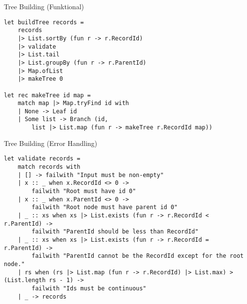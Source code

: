\documentclass[t]{beamer}
\begin{document}
\begin{frame}[label={sec:org32177ed},fragile]{Tree Building (Funktional)}
 \begin{verbatim}
let buildTree records = 
    records
    |> List.sortBy (fun r -> r.RecordId)
    |> validate
    |> List.tail
    |> List.groupBy (fun r -> r.ParentId)
    |> Map.ofList
    |> makeTree 0

let rec makeTree id map =
    match map |> Map.tryFind id with
    | None -> Leaf id
    | Some list -> Branch (id, 
        list |> List.map (fun r -> makeTree r.RecordId map))
\end{verbatim}
\end{frame}

\begin{frame}[label={sec:org222dd47},fragile]{Tree Building (Error Handling)}
 \begin{verbatim}
let validate records =
    match records with
    | [] -> failwith "Input must be non-empty"
    | x :: _ when x.RecordId <> 0 -> 
        failwith "Root must have id 0"
    | x :: _ when x.ParentId <> 0 -> 
        failwith "Root node must have parent id 0"
    | _ :: xs when xs |> List.exists (fun r -> r.RecordId < r.ParentId) -> 
        failwith "ParentId should be less than RecordId"
    | _ :: xs when xs |> List.exists (fun r -> r.RecordId = r.ParentId) -> 
        failwith "ParentId cannot be the RecordId except for the root node."
    | rs when (rs |> List.map (fun r -> r.RecordId) |> List.max) > (List.length rs - 1) -> 
        failwith "Ids must be continuous"
    | _ -> records
\end{verbatim}
\end{frame}
\end{document}
